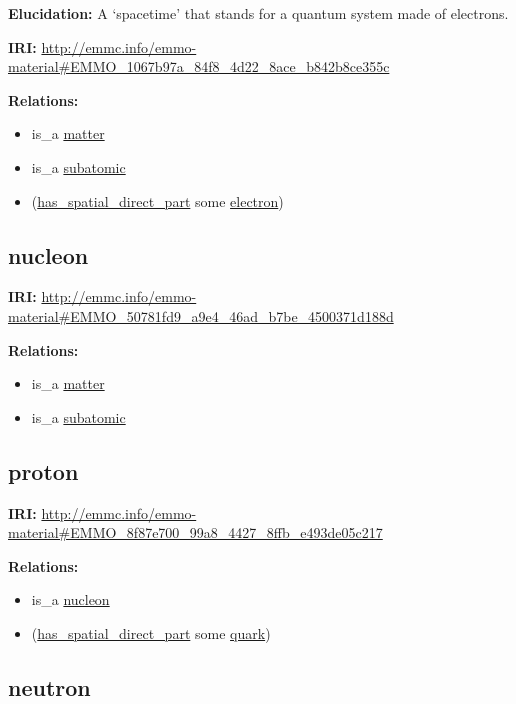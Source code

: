 \documentclass[a4paper,]{report}
\providecommand{\tightlist}{%
  \setlength{\itemsep}{0pt}\setlength{\parskip}{0pt}}
\begin{document}
\textbf{Elucidation:} A `spacetime' that stands for a quantum system
made of electrons.

\textbf{IRI:}
\url{http://emmc.info/emmo-material\#EMMO_1067b97a_84f8_4d22_8ace_b842b8ce355c}

\textbf{Relations:}

\begin{itemize}
\tightlist
\item
  is\_a \protect\hyperlink{matter}{matter}
\item
  is\_a \protect\hyperlink{subatomic}{subatomic}
\item
  (\protect\hyperlink{has_spatial_direct_part}{has\_spatial\_direct\_part}
  some \protect\hyperlink{electron}{electron})
\end{itemize}

\hypertarget{nucleon}{%
\subsection{nucleon}\label{nucleon}}

\textbf{IRI:}
\url{http://emmc.info/emmo-material\#EMMO_50781fd9_a9e4_46ad_b7be_4500371d188d}

\textbf{Relations:}

\begin{itemize}
\tightlist
\item
  is\_a \protect\hyperlink{matter}{matter}
\item
  is\_a \protect\hyperlink{subatomic}{subatomic}
\end{itemize}

\hypertarget{proton}{%
\subsection{proton}\label{proton}}

\textbf{IRI:}
\url{http://emmc.info/emmo-material\#EMMO_8f87e700_99a8_4427_8ffb_e493de05c217}

\textbf{Relations:}

\begin{itemize}
\tightlist
\item
  is\_a \protect\hyperlink{nucleon}{nucleon}
\item
  (\protect\hyperlink{has_spatial_direct_part}{has\_spatial\_direct\_part}
  some \protect\hyperlink{quark}{quark})
\end{itemize}

\hypertarget{neutron}{%
\subsection{neutron}\label{neutron}}
\end{document}
